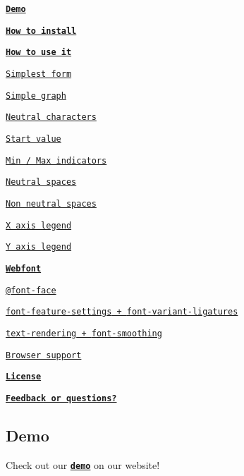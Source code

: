 \begin{DoxyItemize}
\item \href{http://figs-lab.com/datalegreya}{\tt {\bfseries Demo}}
\item \href{#how-to-install}{\tt {\bfseries How to install}}
\item \href{#how-to-use-it}{\tt {\bfseries How to use it}}
\begin{DoxyItemize}
\item \href{#simplest-form}{\tt Simplest form}
\item \href{#simple-graph}{\tt Simple graph}
\item \href{#neutral-characters}{\tt Neutral characters}
\item \href{#start-value}{\tt Start value}
\item \href{#min--max-indicators}{\tt Min / Max indicators}
\item \href{#neutral-spaces}{\tt Neutral spaces}
\item \href{#non-neutral-spaces}{\tt Non neutral spaces}
\item \href{#x-axis-legend}{\tt X axis legend}
\item \href{#y-axis-legend}{\tt Y axis legend}
\end{DoxyItemize}
\item \href{#webfont}{\tt {\bfseries Webfont}}
\begin{DoxyItemize}
\item \href{#font-face}{\tt {\ttfamily @font-\/face}}
\item \href{#font-feature-settings--font-variant-ligatures}{\tt {\ttfamily font-\/feature-\/settings} + {\ttfamily font-\/variant-\/ligatures}}
\item \href{#text-rendering--font-smoothing}{\tt {\ttfamily text-\/rendering} + {\ttfamily font-\/smoothing}}
\item \href{#browser-support}{\tt Browser support}
\end{DoxyItemize}
\item \href{#license}{\tt {\bfseries License}}
\item \href{#feedback-or-questions}{\tt {\bfseries Feedback or questions?}} 


\end{DoxyItemize}

\subsection*{Demo}

Check out our \href{http://figs-lab.com/datalegreya}{\tt {\bfseries demo}} on our website!

